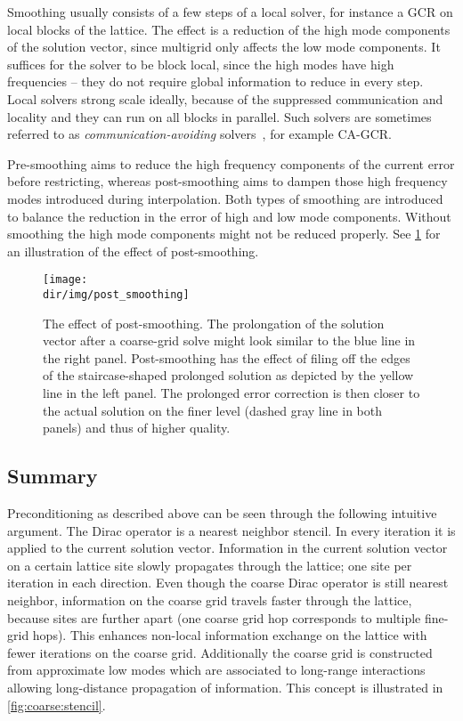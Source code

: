 Smoothing usually consists of a few steps of a local solver, for instance a GCR on local blocks of the lattice.
The effect is a reduction of the high mode components of the solution vector, since multigrid only affects the low mode components.
It suffices for the solver to be block local, since the high modes have high frequencies -- they do not require global information to reduce in every step.
Local solvers strong scale ideally, because of the suppressed communication and locality and they can run on all blocks in parallel.
Such solvers are sometimes referred to as \emph{communication-avoiding} solvers~\cite{naumov2016s}, for example CA-GCR.

Pre-smoothing aims to reduce the high frequency components of the current error before restricting, whereas post-smoothing aims to dampen those high frequency modes introduced during interpolation.
Both types of smoothing are introduced to balance the reduction in the error of high and low mode components.
Without smoothing the high mode components might not be reduced properly.
See \cref{fig:post:smoothing} for an illustration of the effect of post-smoothing.
\begin{figure}
    \centering
    \texttt{[image: \\dir/img/post\_smoothing]}
    \caption{The effect of post-smoothing. The prolongation of the solution vector after a coarse-grid solve might look similar to the blue line in the right panel. Post-smoothing has the effect of filing off the edges of the staircase-shaped prolonged solution as depicted by the yellow line in the left panel. The prolonged error correction is then closer to the actual solution on the finer level (dashed gray line in both panels) and thus of higher quality.}
    \label{fig:post:smoothing}
\end{figure}

\subsection{Summary}

Preconditioning as described above can be seen through the following intuitive argument.
The Dirac operator is a nearest neighbor stencil.
In every iteration it is applied to the current solution vector.
Information in the current solution vector on a certain lattice site slowly propagates through the lattice; one site per iteration in each direction.
Even though the coarse Dirac operator is still nearest neighbor, information on the coarse grid travels faster through the lattice, because sites are further apart (\ie one coarse grid hop corresponds to multiple fine-grid hops).
This enhances non-local information exchange on the lattice with fewer iterations on the coarse grid.
Additionally the coarse grid is constructed from approximate low modes which are associated to long-range interactions allowing long-distance propagation of information.
This concept is illustrated in \cref{fig:coarse:stencil}.

